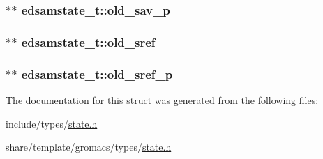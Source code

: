\hypertarget{structedsamstate__t_af1fa8df393d72adc8510da5ede8adff0}{
\subsubsection[{old\-\_\-sav\-\_\-p}]{ $\ast$$\ast$ {\bf edsamstate\-\_\-t\-::old\-\_\-sav\-\_\-p}}}\label{structedsamstate__t_af1fa8df393d72adc8510da5ede8adff0}
\hypertarget{structedsamstate__t_a8649ba9780e5c51ac4a98ce308787bbb}{
\subsubsection[{old\-\_\-sref}]{ $\ast$$\ast$ {\bf edsamstate\-\_\-t\-::old\-\_\-sref}}}\label{structedsamstate__t_a8649ba9780e5c51ac4a98ce308787bbb}
\hypertarget{structedsamstate__t_aa5b3cd7ac42ad2a1f38a400c09f5d204}{
\subsubsection[{old\-\_\-sref\-\_\-p}]{ $\ast$$\ast$ {\bf edsamstate\-\_\-t\-::old\-\_\-sref\-\_\-p}}}\label{structedsamstate__t_aa5b3cd7ac42ad2a1f38a400c09f5d204}


\-The documentation for this struct was generated from the following files\-:\begin{DoxyCompactItemize}
\item 
include/types/\hyperlink{include_2types_2state_8h}{state.\-h}\item 
share/template/gromacs/types/\hyperlink{share_2template_2gromacs_2types_2state_8h}{state.\-h}\end{DoxyCompactItemize}
